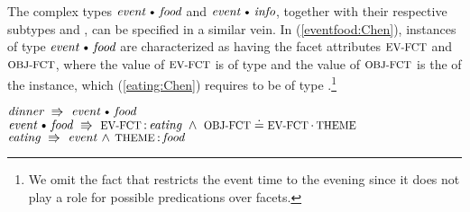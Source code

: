 \documentclass[output=paper,colorlinks,citecolor=brown,chinesefont]{langscibook}
\begin{document}
The complex types $\type{event}\dott\type{food}$ and $\type{event}\dott\type{info}$, together with their respective subtypes  and , can be specified in a similar vein.
In (\ref{eventfood:Chen}), instances of type $\type{event}\dott\type{food}$ are characterized as having the facet attributes $\feat{ev-fct}$ and $\feat{obj-fct}$, where the value of $\feat{ev-fct}$ is of type  and the value of $\feat{obj-fct}$ is the  of the  instance, which (\ref{eating:Chen}) requires to be of type .\footnote{We omit the fact that  restricts the event time to the evening since it does not play a role for possible predications over facets.}

\ea\label{dinnerconstraints:Chen}
\ea
$\type{dinner}~\implic~\type{event}\dott\type{food}$
\ex\label{eventfood:Chen}
$\type{event}\dott\type{food}~\implic~\feat{ev-fct}\D\type{eating}\,\und\,\feat{obj-fct}\patheq\feat{ev-fct}\CP\feat{theme}$
\ex\label{eating:Chen}
$\type{eating}~\implic~\type{event}\und\feat{theme}\D\type{food}$
\z
\z
\end{document}
